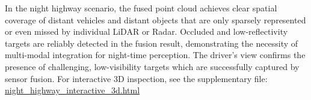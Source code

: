 \documentclass[10pt, a4paper, oneside]{article}
\begin{document}
In the night highway scenario, the fused point cloud achieves clear spatial coverage of distant vehicles and distant objects that are only sparsely represented or even missed by individual LiDAR or Radar. Occluded and low-reflectivity targets are reliably detected in the fusion result, demonstrating the necessity of multi-modal integration for night-time perception. The driver’s view confirms the presence of challenging, low-visibility targets which are successfully captured by sensor fusion.
For interactive 3D inspection, see the supplementary file:  \href{run:../output/scene_night_highway/85c5ca01cfb34d3e92d1c0c265235d04/interactive_3d.html}{night\_highway\_interactive\_3d.html}
\begin{small}
\end{small}
\end{document}
